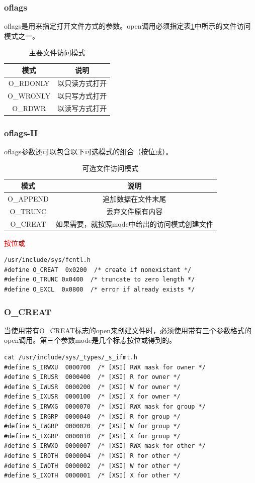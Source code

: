 \documentclass{beamer}
\begin{document}
\begin{frame}
\frametitle{oflags}
oflags是用来指定打开文件方式的参数。open调用必须指定表\ref{主要文件访问模式}中所示的文件访问模式之一。
\begin{table}
\begin{tabular}{cc}
\toprule
\textbf{模式} & \textbf{说明} \\
\midrule
O\_RDONLY & 以只读方式打开\\
O\_WRONLY & 以只写方式打开\\
O\_RDWR & 以读写方式打开\\
\bottomrule
\end{tabular}
\caption{主要文件访问模式}
\label{主要文件访问模式}
\end{table}
\end{frame}
\begin{frame}[fragile]
\frametitle{oflags-II}
oflags参数还可以包含以下可选模式的组合（按位或）。
\begin{table}
\begin{tabular}{cc}
\toprule
\textbf{模式} & \textbf{说明} \\
\midrule
O\_APPEND & 追加数据在文件末尾\\
O\_TRUNC & 丢弃文件原有内容\\
O\_CREAT & 如果需要，就按照mode中给出的访问模式创建文件\\
\bottomrule
\end{tabular}
\caption{可选文件访问模式}
\label{可选文件访问模式}
\end{table}
\textcolor{red}{按位或}
\begin{lstlisting}
/usr/include/sys/fcntl.h
#define O_CREAT  0x0200  /* create if nonexistant */
#define O_TRUNC 0x0400  /* truncate to zero length */
#define O_EXCL  0x0800  /* error if already exists */
\end{lstlisting}
\end{frame}

\begin{frame}[fragile]
\frametitle{O\_CREAT}
当使用带有O\_CREAT标志的open来创建文件时，必须使用带有三个参数格式的open调用。第三个参数mode是几个标志按位或得到的。
\begin{lstlisting}
cat /usr/include/sys/_types/_s_ifmt.h
#define S_IRWXU  0000700  /* [XSI] RWX mask for owner */
#define S_IRUSR  0000400  /* [XSI] R for owner */
#define S_IWUSR  0000200  /* [XSI] W for owner */
#define S_IXUSR  0000100  /* [XSI] X for owner */
#define S_IRWXG  0000070  /* [XSI] RWX mask for group */
#define S_IRGRP  0000040  /* [XSI] R for group */
#define S_IWGRP  0000020  /* [XSI] W for group */
#define S_IXGRP  0000010  /* [XSI] X for group */
#define S_IRWXO  0000007  /* [XSI] RWX mask for other */
#define S_IROTH  0000004  /* [XSI] R for other */
#define S_IWOTH  0000002  /* [XSI] W for other */
#define S_IXOTH  0000001  /* [XSI] X for other */
\end{lstlisting}
\end{frame}
\end{document}
